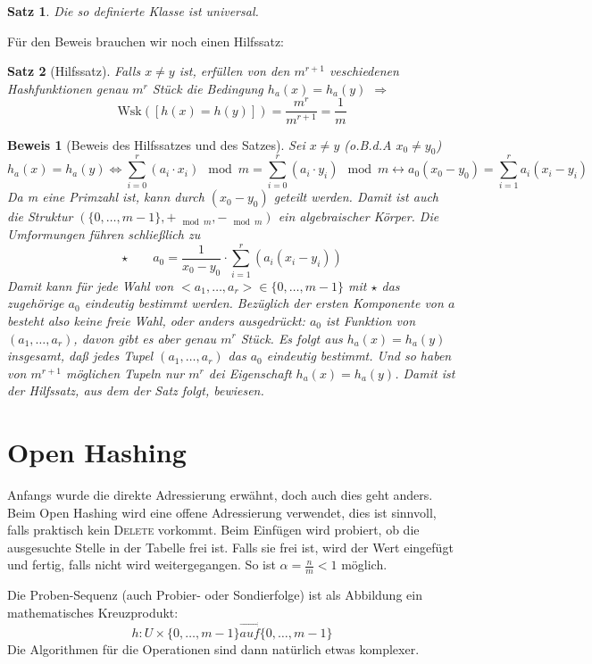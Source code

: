 \documentclass[ngerman,draft,parskip=half*,twoside]{scrreprt}
\theoremstyle{break}
\newtheorem{beweis}{Beweis}
\newtheorem{satz}{Satz}
\begin{document}
\begin{satz}
Die so definierte Klasse ist universal.
\end{satz}
Für den Beweis brauchen wir noch einen Hilfssatz:
\begin{satz}[Hilfssatz]
Falls $x\not= y$ ist, erfüllen von den $m^{r+1}$ veschiedenen Hashfunktionen genau $m^r$ Stück die Bedingung
$h_a(x)=h_a(y)$ $\Rightarrow$ \[\mbox{Wsk}([h(x)=h(y)])=\frac{m^r}{m^{r+1}}=\frac{1}{m}\]
\end{satz}
\begin{beweis}[Beweis des Hilfssatzes und des Satzes]
Sei $x\not=y$ (o.B.d.A $x_0 \not=y_0$)
\[h_a(x)=h_a(y) \Leftrightarrow \sum_{i=0}^r (a_i \cdot x_i)\!\! \mod m=\sum_{i=0}^r (a_i \cdot y_i)\!\! \mod m \leftrightarrow
a_0(x_0-y_0)=\sum_{i=1}^r a_i (x_i- y_i)\]
Da m eine Primzahl ist, kann durch $(x_0-y_0)$ geteilt werden. Damit ist auch die Struktur $(\{0, \ldots, m-1\}, +_{\mod
m}, -_{\mod m})$ ein algebraischer Körper. Die Umformungen führen schließlich zu \[\star  \qquad 
a_0=\frac{1}{x_0-y_0} \cdot \sum_{i=1}^r (a_i (x_i- y_i))\]
Damit kann für jede Wahl von $<a_1, \ldots, a_r> \in \{0, \ldots, m-1\}$ mit $\star$ das zugehörige $a_0$ eindeutig
bestimmt werden. Bezüglich der ersten Komponente von $a$ besteht also keine freie Wahl, oder anders ausgedrückt: $a_0$
ist Funktion von $(a_1, \ldots, a_r)$, davon gibt es aber genau $m^r$ Stück. Es folgt aus $h_a(x)=h_a(y)$ insgesamt,
daß jedes Tupel $(a_1, \ldots, a_r)$ das $a_0$ eindeutig bestimmt. Und so haben von $m^{r+1}$ möglichen Tupeln nur
$m^r$ dei Eigenschaft $h_a(x)=h_a(y)$. Damit ist der Hilfssatz, aus dem der Satz folgt, bewiesen.
\end{beweis}

\section{Open Hashing}
Anfangs wurde die direkte Adressierung erwähnt, doch auch dies geht anders. Beim Open Hashing wird eine offene
Adressierung verwendet, dies ist sinnvoll, falls praktisch kein \textsc{Delete} vorkommt. Beim Einfügen wird probiert,
ob die ausgesuchte Stelle in der Tabelle frei ist. Falls sie frei ist, wird der Wert eingefügt und fertig, falls nicht
wird weitergegangen. So ist $\alpha=\frac{n}{m}<1$ möglich.

Die Proben-Sequenz (auch Probier- oder Sondierfolge) ist als Abbildung ein mathematisches Kreuzprodukt:
\[h: U \times \{0, \ldots, m-1\} \stackrel{\rightarrow}{auf}\{0, \ldots, m-1\}\]
Die Algorithmen für die Operationen sind dann natürlich etwas komplexer.
\end{document}
